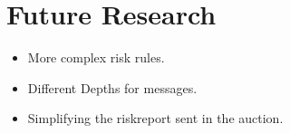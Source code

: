\section{Future Research}
\label{sec:future-research}

\begin{itemize}
    \item More complex risk rules.
    \item Different Depths for messages.
    \item Simplifying the riskreport sent in the auction.
\end{itemize}
